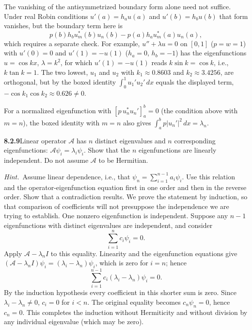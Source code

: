 The vanishing of the antisymmetrized boundary form alone need not
suffice.  Under real Robin conditions $u'(a)=h_a u(a)$ and
$u'(b)=h_bu(b)$ that form vanishes, but the boundary term here is
\[
p(b)h_bu_m^*(b)u_n(b)-p(a)h_au_m^*(a)u_n(a),
\]
which requires a separate check.  For example, $u''+\lambda u=0$ on
$[0,1]$ ($p=w=1$) with $u'(0)=0$ and $u'(1)=-u(1)$ ($h_a=0$,
$h_b=-1$) has the eigenfunctions $u=\cos kx$, $\lambda=k^2$, for which
$u'(1)=-u(1)$ reads $k\sin k=\cos k$, i.e., $k\tan k=1$.  The two
lowest, $u_1$ and $u_2$ with $k_1\approx0.8603$ and $k_2\approx3.4256$,
are orthogonal, but by the boxed identity $\int_0^1u_1'u_2'\,dx$
equals the displayed term, $-\cos k_1\cos k_2\approx0.626\ne0$.

For a normalized eigenfunction with $[p\,u_n^*u_n']_a^b=0$ (the
condition above with $m=n$), the boxed identity with $m=n$ also gives
$\int_a^b p|u_n'|^2\,dx=\lambda_n$.


\par\bigskip
\noindent\textbf{8.2.9}\quad Linear operator $\mathcal{A}$ has $n$ distinct
eigenvalues and $n$ corresponding eigenfunctions:
$\mathcal{A}\psi_{i}=\lambda_{i}\psi_{i}$. Show that the $n$ eigenfunctions
are linearly independent. Do not assume $\mathcal{A}$ to be Hermitian.

\emph{Hint.}~Assume linear dependence, i.e., that
$\psi_{n}=\sum_{i=1}^{n-1}a_{i}\psi_{i}$. Use this relation and the
operator-eigenfunction equation first in one order and then in the reverse
order. Show that a contradiction results.
\solution
We prove the statement by induction, so that comparison of coefficients
will not presuppose the independence we are trying to establish.
One nonzero eigenfunction is independent.  Suppose any $n-1$
eigenfunctions with distinct eigenvalues are independent, and consider
\[
\sum_{i=1}^n c_i\psi_i=0.
\]
Apply $\mathcal A-\lambda_n I$ to this equality.  Linearity and the
eigenfunction equations give
$(\mathcal A-\lambda_nI)\psi_i=(\lambda_i-\lambda_n)\psi_i$, which is
zero for $i=n$; hence
\[
\sum_{i=1}^{n-1}c_i(\lambda_i-\lambda_n)\psi_i=0.
\]
By the induction hypothesis every coefficient in this shorter sum is
zero.  Since $\lambda_i-\lambda_n\ne0$, $c_i=0$ for $i<n$.
The original equality becomes $c_n\psi_n=0$, hence $c_n=0$.
This completes the induction without Hermiticity and without division
by any individual eigenvalue (which may be zero).


